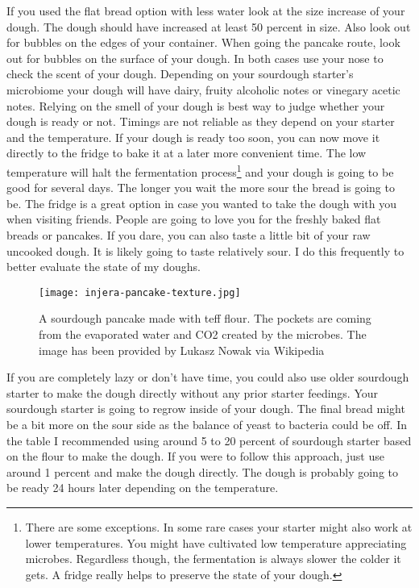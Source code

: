 If you used the flat bread option with less water look at the size increase
of your dough. The dough should have increased at least 50 percent in size.
Also look out for bubbles on the edges of your container.
When going the pancake route, look out for bubbles on the surface of your dough.
In both cases use your nose to check the scent of your dough. Depending
on your sourdough starter's microbiome your dough will have 
dairy, fruity alcoholic notes or vinegary acetic notes. Relying
on the smell of your dough is best way to judge whether your
dough is ready or not. Timings are not reliable as they
depend on your starter and the temperature. If your dough
is ready too soon, you can now move it directly to the fridge to bake
it at a later more convenient time. The low temperature will halt the fermentation
process\footnote{There are some exceptions. In some rare cases your starter
might also work at lower temperatures. You might have cultivated low temperature appreciating
microbes. Regardless though, the fermentation
is always slower the colder it gets. A fridge really helps to preserve the state
of your dough.}
and your dough is going to be good for several days. The longer you wait the more sour the
bread is going to be. The fridge is a great option in case you wanted to
take the dough with you when visiting friends. People are going
to love you for the freshly baked flat breads or pancakes. If you dare,
you can also taste a little bit of your raw uncooked dough. It is likely
going to taste relatively sour. I do this frequently to better evaluate the
state of my doughs.


\begin{figure}[htb!]
  \texttt{[image: injera-pancake-texture.jpg]}
  \centering
  \caption{A sourdough pancake made with teff flour. The pockets are coming from
  the evaporated water and CO2 created by the microbes.
  The image has been provided by Lukasz Nowak via Wikipedia}
\end{figure}

If you are completely lazy or don't have time, you could also use older sourdough starter
to make the dough directly without any prior starter feedings. Your sourdough starter
is going to regrow inside of your dough. The
final bread might be a bit more on the sour side as the balance of yeast to
bacteria could be off. In the table I recommended using around 5 to 20 percent
of sourdough starter based on the flour to make the dough. If you were to follow
this approach, just use around 1 percent and make the dough directly.
The dough is probably going to be ready 24 hours later depending on the temperature.

